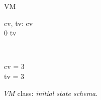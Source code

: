 \begin{figure}[H]
\centering
\begin{class}{VM}
\begin{state}
cv, tv: \integer
{} \leq  cv 
\\
0 \leq  tv 
\end{state} 
\\
\begin{init}
cv = 3
\\tv = 3
\end{init} 
\end{class}
\caption{$VM$ class: \textit{initial state schema}.}
\label{oz_vm_init_schema}
\end{figure}